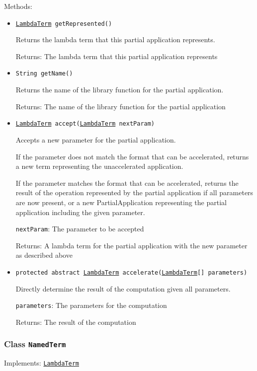 Methods:
\begin{itemize}
\item \texttt{\hyperref[type:edu.kit.wavelength.client.model.term.LambdaTerm]{LambdaTerm} getRepresented()}

Returns the lambda term that this partial application represents.

Returns: The lambda term that this partial application represents

\item \texttt{String getName()}

Returns the name of the library function for the partial application.

Returns: The name of the library function for the partial application

\item \texttt{\hyperref[type:edu.kit.wavelength.client.model.term.LambdaTerm]{LambdaTerm} accept(\hyperref[type:edu.kit.wavelength.client.model.term.LambdaTerm]{LambdaTerm} nextParam)}

Accepts a new parameter for the partial application.
 
 If the parameter does not match the format that can be accelerated, returns a new term representing
 the unaccelerated application.
 
 If the parameter matches the format that can be accelerated, returns the result of the operation
 represented by the partial application if all parameters are now present, or a new PartialApplication
 representing the partial application including the given parameter.

\texttt{nextParam}: The parameter to be accepted

Returns: A lambda term for the partial application with the new parameter as described above

\item \texttt{protected abstract \hyperref[type:edu.kit.wavelength.client.model.term.LambdaTerm]{LambdaTerm} accelerate(\hyperref[type:edu.kit.wavelength.client.model.term.LambdaTerm]{LambdaTerm}[] parameters)}

Directly determine the result of the computation given all parameters.

\texttt{parameters}: The parameters for the computation

Returns: The result of the computation

\end{itemize}

\subsubsection{Class \texttt{NamedTerm}}
\label{type:edu.kit.wavelength.client.model.term.NamedTerm}
Implements: \texttt{\hyperref[type:edu.kit.wavelength.client.model.term.LambdaTerm]{LambdaTerm}}

